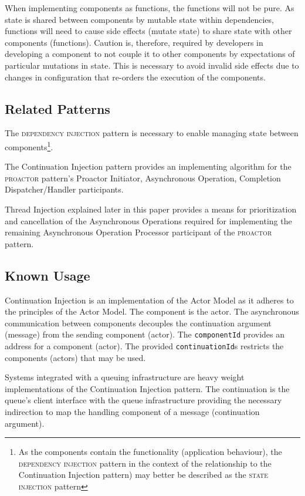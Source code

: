 \documentclass[prodmode]{style/acmlarge}
\begin{document}
When implementing components as functions, the functions will not be pure.  As
state is shared between components by mutable state within dependencies,
functions will need to cause side effects (mutate state) to share state with
other components (functions).  Caution is, therefore, required by developers in
developing a component to not couple it to other components by expectations of
particular mutations in state.  This is necessary to avoid invalid side effects
due to changes in configuration that re-orders the execution of the components.


\subsection{Related Patterns}

The \textsc{dependency injection} pattern \cite{ioc} is necessary to enable
managing state between components\footnote{As the components contain the
functionality (application behaviour), the \textsc{dependency injection} pattern
in the context of the relationship to the Continuation Injection pattern) may
better be described as the \textsc{state injection} pattern}.

The Continuation Injection pattern provides an implementing algorithm for the
\textsc{proactor} pattern's Proactor Initiator, Asynchronous Operation, Completion
Dispatcher/Handler participants.

Thread Injection explained later in this paper provides a means for
prioritization and cancellation of the Asynchronous Operations required for
implementing the remaining Asynchronous Operation Processor participant of the
\textsc{proactor} pattern.


\subsection{Known Usage}

Continuation Injection is an implementation of the Actor Model \cite{actors} as
it adheres to the principles of the Actor Model.  The component is the actor.
The asynchronous communication between components decouples the continuation
argument (message) from the sending component (actor).  The \texttt{componentId}
provides an address for a component (actor).  The provided
\texttt{continuationId}s restricts the components (actors) that may be used.

Systems integrated with a queuing infrastructure are heavy weight
implementations of the Continuation Injection pattern.  The continuation is the
queue's client interface with the queue infrastructure providing the necessary
indirection to map the handling component of a message (continuation argument).
\end{document}
